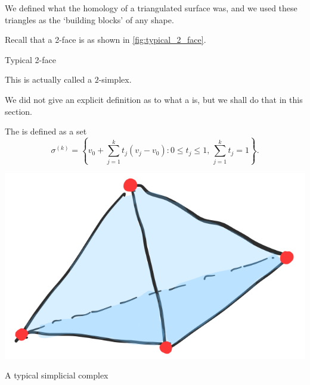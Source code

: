\documentclass[notoc,notitlepage]{tufte-book}
\begin{document}
We defined what the homology of a triangulated surface was, and we used these
triangles as the `building blocks' of any shape.

\begin{eg}
  Recall that a 2-face is as shown in \cref{fig:typical_2_face}.
  \begin{marginfigure}
    \centering
    \caption{Typical 2-face}
    \label{fig:typical_2_face}
  \end{marginfigure}
  This is actually called a $2$-simplex.
\end{eg}

We did not give an explicit definition as to what a  is, but we
shall do that in this section.

\begin{defn}[Simplices]\label{defn:simplices}
  The  is defined as a set
  \begin{equation*}
    \sigma^{(k)} = \left\{ v_0 + \sum_{j=1}^{k} t_j (v_j - v_0) : 0 \leq t_j
    \leq 1, \, \sum_{j=1}^{k} t_j = 1 \right\}.
  \end{equation*}
\end{defn}
\begin{marginfigure}
  \centering
  \includegraphics[width=\marginparwidth]{images/typical-2-simplicial-complex.png}
  \caption{A typical simplicial complex}\label{fig:a_typical_simplicial_complex}
\end{marginfigure}
\end{document}
